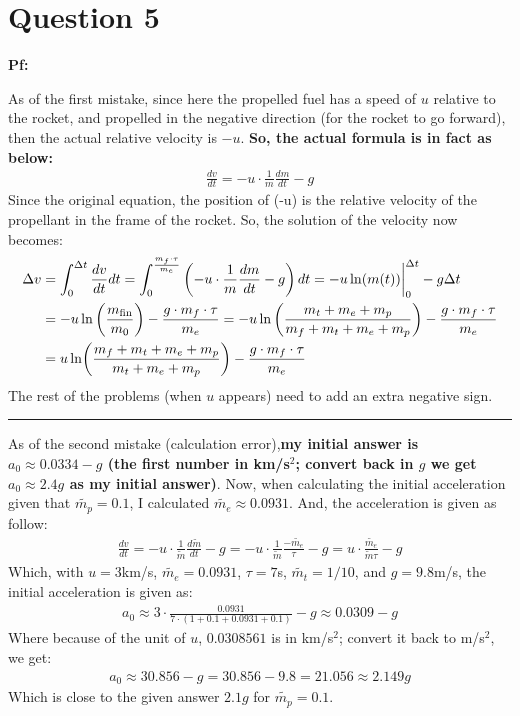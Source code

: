 \documentclass{article}
\DeclarePairedDelimiter{\paran}{(}{)}%
\begin{document}
\break

\section*{Question 5}

\textbf{Pf:}

As of the first mistake, since here the propelled fuel has a speed of $u$ relative to the rocket, and propelled in the negative direction (for the rocket to go forward), then the actual relative velocity is $-u$. \textbf{So, the actual formula is in fact as below:}
\begin{align}
    \frac{dv}{dt}=-u\cdot\frac{1}{m}\frac{dm}{dt}-g
\end{align}
Since the original equation, the position of (-u) is the relative velocity of the propellant in the frame of the rocket. So, the solution of the velocity now becomes:
\begin{align}
    \Delta v&=\int_0^{\Delta t}\frac{dv}{dt}dt = \int_0^{\frac{m_f\cdot \tau}{m_e}}\left(-u\cdot\frac{1}{m}\frac{dm}{dt}-g\right)dt = -u\ln(m(t))\bigg|_0^{\Delta t}-g\Delta t\\
    &=-u\ln\left(\frac{m_{\textmd{fin}}}{m_0}\right)-\frac{g\cdot m_f\cdot \tau}{m_e} = -u\ln\left(\frac{m_t+m_e+m_p}{m_f+m_t+m_e+m_p}\right)-\frac{g\cdot m_f\cdot \tau}{m_e}\\
    &= u\ln\paran*{\frac{m_f+m_t+m_e+m_p}{m_t+m_e+m_p}}-\frac{g\cdot m_f\cdot \tau}{m_e}
\end{align}
The rest of the problems (when $u$ appears) need to add an extra negative sign.

\hfil

\rule{15.6cm}{0.1mm}

\hfil

As of the second mistake (calculation error),\textbf{my initial answer is $a_0\approx 0.0334-g$ (the first number in km/s$^2$; convert back in $g$ we get $a_0\approx 2.4g$ as my initial answer)}. Now, when calculating the initial acceleration given that $\tilde{m_p}=0.1$, I calculated $\tilde{m_e}\approx 0.0931$. And, the acceleration is given as follow:
\begin{align}
    \frac{dv}{dt}=-u\cdot \frac{1}{\tilde{m}}\frac{d\tilde{m}}{dt}-g = -u\cdot \frac{1}{\tilde{m}}\frac{-\tilde{m_e}}{\tau}-g = u\cdot\frac{\tilde{m_e}}{\tilde{m}\tau}-g
\end{align}
Which, with $u=3$km/s, $\tilde{m_e}= 0.0931$, $\tau=7$s, $\tilde{m_t}=1/10$, and $g=9.8$m/s, the initial acceleration is given as:
\begin{align}
    a_0 \approx 3\cdot \frac{0.0931}{7\cdot (1+0.1+0.0931+0.1)}-g \approx 0.0309-g
\end{align}
Where because of the unit of $u$, $0.0308561$ is in km/s$^2$; convert it back to m/s$^2$, we get:
\begin{align}
    a_0 \approx 30.856-g = 30.856-9.8 = 21.056 \approx 2.149 g
\end{align}
Which is close to the given answer $2.1g$ for $\tilde{m_p}=0.1$.

\break
\end{document}

